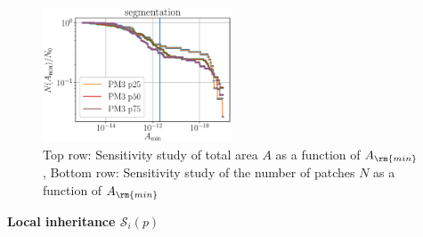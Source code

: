 \documentclass[draft,jgrga]{agutexSI2019}
\begin{document}
\begin{article}
\begin{figure}
\noindent\includegraphics[height=4cm]{figures/SI_figures/segm_N_vs_Amin_PM3.eps}
\caption{Top row: Sensitivity study of total area $A$ as a function of $A_{\rm{min}}$, Bottom row:  Sensitivity study of the number of patches $N$ as a function of $A_{\rm{min}}$}
\end{figure}


\noindent\textbf{Local inheritance $\mathcal{S}_i(p)$}


\end{article}
\end{document}
